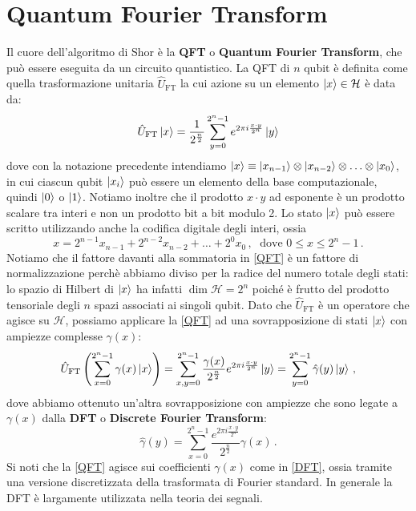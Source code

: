 \section{Quantum Fourier Transform}
Il cuore dell'algoritmo di Shor è la \textbf{QFT} o \textbf{Quantum Fourier Transform}, che può essere eseguita da un circuito quantistico. La QFT di $n$ qubit è definita come quella trasformazione unitaria $\hat U_{\text{FT}}$ la cui azione su un elemento $\ket{x} \in \mathcal{H}$ è data da:
\begin{equation}\label{QFT}
    \hat U_{\text{FT}}\ket x = \frac{1}{2^{\frac n2}}\sum_{y=0}^{2^n-1}e^{2\pi i\frac{ x \cdot y }{2^n}}\ket y
\end{equation}
dove con la notazione precedente intendiamo $\ket{x} \equiv \ket{x_{n-1}} \otimes \ket{x_{n-2}} \otimes \ldots \otimes \ket{x_0}$, in cui ciascun qubit $\ket{x_i}$ può essere un elemento della base computazionale, quindi $\ket{0}$ o $\ket{1}$. Notiamo inoltre che il prodotto $x \cdot y$ ad esponente è un prodotto scalare tra interi e non un prodotto bit a bit modulo 2. Lo stato $\ket{x}$ può essere scritto utilizzando anche la codifica digitale degli interi, ossia
\begin{equation*}
    x = 2^{n-1} x_{n-1} + 2^{n-2} x_{n-2} + \ldots + 2^{0} x_0 \, , \; \text{ dove } 0 \leqslant x \leqslant 2^n - 1 \, .
\end{equation*}
Notiamo che il fattore davanti alla sommatoria in \eqref{QFT} è un fattore di normalizzazione perchè abbiamo diviso per la radice del numero totale degli stati: lo spazio di Hilbert di $\ket{x}$ ha infatti $\dim \mathcal{H} = 2^n$ poiché è frutto del prodotto tensoriale degli $n$ spazi associati ai singoli qubit. Dato che $\hat U_{\text{FT}}$ è un operatore che agisce su $\mathcal{H}$, possiamo applicare la \eqref{QFT} ad una sovrapposizione di stati $\ket x$ con ampiezze complesse $\gamma(x)$:
\begin{equation}
    \label{eq:qtf2}
    \hat U_{\text{FT}} \left( \sum_{x=0}^{2^n-1}\gamma(x)\ket x \right) = \sum_{x,y=0}^{2^n-1} \frac{\gamma(x)}{2^{\frac n2}} e^{2\pi i \frac{x\cdot y}{2^n}} \ket y = \sum_{y=0}^{2^n-1}\hat \gamma(y)\ket y \, ,
\end{equation}
dove abbiamo ottenuto un'altra sovrapposizione con ampiezze che sono legate a $\gamma(x)$ dalla \textbf{DFT} o \textbf{Discrete Fourier Transform}:
\begin{equation}\label{DFT}
    \hat \gamma(y)=\sum_{x=0}^{2^n-1}\frac{e^{2\pi i \frac{x\cdot y}{2^n}}}{2^{\frac n2}}\gamma(x) \, .
\end{equation}
Si noti che la \eqref{QFT} agisce sui coefficienti $\gamma(x)$ come in \eqref{DFT}, ossia tramite una versione discretizzata della trasformata di Fourier standard. In generale la DFT è largamente utilizzata nella teoria dei segnali. 


